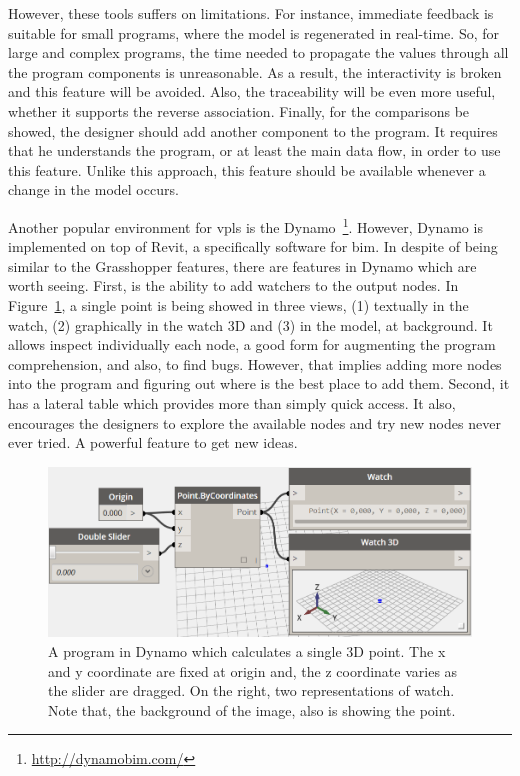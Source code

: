 However, these tools suffers on limitations. For instance, immediate feedback is suitable for small programs, where the model is regenerated in real-time. So, for large and complex programs, the time needed to propagate the values through all the program components is unreasonable. As a result, the interactivity is broken and this feature will be avoided. Also, the traceability will be even more useful, whether it supports the reverse association. Finally, for the comparisons be showed, the designer should add another component to the program. It requires that he understands the program, or at least the main data flow, in order to use this feature. Unlike this approach, this feature should be available whenever a change in the model occurs.

Another popular environment for \ac{vpls} is the Dynamo~\footnote{\url{http://dynamobim.com/}}. However, Dynamo is implemented on top of Revit, a specifically software for \ac{bim}. In despite of being similar to the Grasshopper features, there are features in Dynamo which are worth seeing. First, is the ability to add watchers to the output nodes. In Figure~\ref{fig:dynamo}, a single point is being showed in three views, (1) textually in the watch, (2) graphically in the watch 3D and (3) in the model, at background. It allows inspect individually each node, a good form for augmenting the program comprehension, and also, to find bugs. However, that implies adding more nodes into the program and figuring out where is the best place to add them. Second, it has a lateral table which provides more than simply quick access. It also, encourages the designers to explore the available nodes and try new nodes never ever tried. A powerful feature to get new ideas. 

\begin{figure}[h]
  \centering
  \includegraphics[scale=0.3]{img/dynamo}
    \caption{A program in Dynamo which calculates a single 3D point. The x and y coordinate are fixed at origin and, the z coordinate varies as the slider are dragged. On the right, two representations of watch. Note that, the background of the image, also is showing the point.}
  \label{fig:dynamo}
\end{figure}

